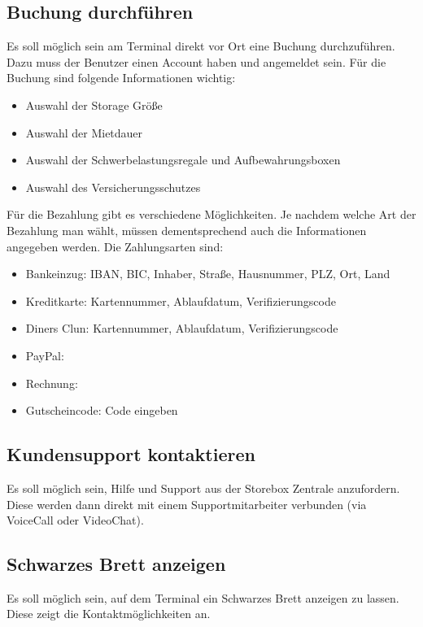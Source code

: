 \subsection{Buchung durchführen}
Es soll möglich sein am Terminal direkt vor Ort eine Buchung durchzuführen. Dazu muss der Benutzer einen Account haben und angemeldet sein. Für die Buchung sind folgende Informationen wichtig:
\begin{itemize}
    \item Auswahl der Storage Größe
    \item Auswahl der Mietdauer
    \item Auswahl der Schwerbelastungsregale und Aufbewahrungsboxen
    \item Auswahl des Versicherungsschutzes
\end{itemize}
Für die Bezahlung gibt es verschiedene Möglichkeiten. Je nachdem welche Art der Bezahlung man wählt, müssen dementsprechend auch die Informationen angegeben werden. Die Zahlungsarten sind:
\begin{itemize}
    \item Bankeinzug: IBAN, BIC, Inhaber, Straße, Hausnummer, PLZ, Ort, Land
    \item Kreditkarte: Kartennummer, Ablaufdatum, Verifizierungscode
    \item Diners Clun: Kartennummer, Ablaufdatum, Verifizierungscode
    \item PayPal:
    \item Rechnung:
    \item Gutscheincode: Code eingeben
\end{itemize}
\subsection{Kundensupport kontaktieren}
Es soll möglich sein, Hilfe und Support aus der Storebox Zentrale anzufordern. Diese werden dann direkt mit einem Supportmitarbeiter verbunden (via VoiceCall oder VideoChat).
\subsection{Schwarzes Brett anzeigen}
Es soll möglich sein, auf dem Terminal ein Schwarzes Brett anzeigen zu lassen. Diese zeigt die Kontaktmöglichkeiten an.